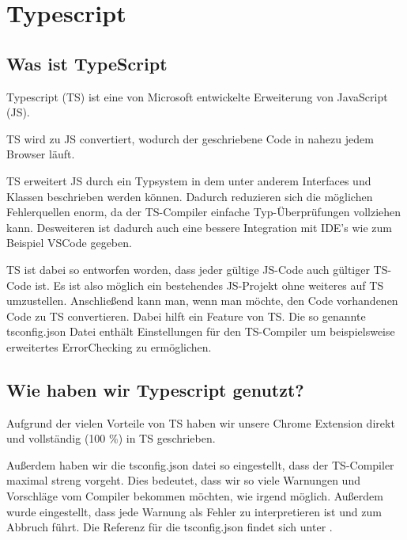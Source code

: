 \section{Typescript}

\subsection{Was ist TypeScript}

Typescript (TS) ist eine von Microsoft entwickelte Erweiterung von JavaScript (JS). \cite{typescript}

TS wird zu JS convertiert, wodurch der geschriebene Code in nahezu jedem Browser läuft. \cite{typescript}

TS erweitert JS durch ein Typsystem in dem unter anderem Interfaces und Klassen beschrieben werden können. Dadurch reduzieren sich die möglichen Fehlerquellen enorm, da der TS-Compiler einfache Typ-Überprüfungen vollziehen kann. Desweiteren ist dadurch auch eine bessere Integration mit IDE's wie zum Beispiel VSCode gegeben. \cite{typescript}

TS ist dabei so entworfen worden, dass jeder gültige JS-Code auch gültiger TS-Code ist. Es ist also möglich ein bestehendes JS-Projekt ohne weiteres auf TS umzustellen. Anschließend kann man, wenn man möchte, den Code vorhandenen Code zu TS convertieren. \cite{typescript} \cite{ts-doku} Dabei hilft ein Feature von TS. Die so genannte tsconfig.json Datei enthält Einstellungen für den TS-Compiler um beispielsweise erweitertes ErrorChecking zu ermöglichen. \cite{tsconfig}

\subsection{Wie haben wir Typescript genutzt?}

Aufgrund der vielen Vorteile von TS haben wir unsere Chrome Extension direkt und vollständig (100 \%) in TS geschrieben.

Außerdem haben wir die tsconfig.json datei so eingestellt, dass der TS-Compiler maximal streng vorgeht. Dies bedeutet, dass wir so viele Warnungen und Vorschläge vom Compiler bekommen möchten, wie irgend möglich. Außerdem wurde eingestellt, dass jede Warnung als Fehler zu interpretieren ist und zum Abbruch führt. Die Referenz für die tsconfig.json findet sich unter \cite{tsconfig}.


